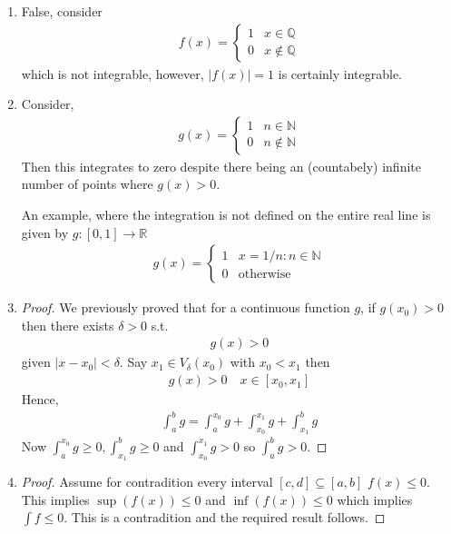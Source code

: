 \begin{enumerate}[label=(\alph*)]
    \item 
    False, consider
    \begin{align*}
        f(x) = \begin{cases}
            1 & x\in \mathbb{Q} \\
            0 & x\not\in \mathbb{Q} 
        \end{cases}
    \end{align*}
    which is not integrable, however, $|f(x)|=1$ is 
    certainly integrable.

    \item
    Consider,
    \begin{align*}
        g(x) = \begin{cases}
            1 & n\in \mathbb{N} \\
            0 & n\not\in \mathbb{N}
        \end{cases}
    \end{align*}
    Then this integrates to zero despite there being an (countabely) infinite 
    number of points where $g(x)>0$.

    An example, where the integration is not defined on the entire real 
    line is given by $g: [0,1]\rightarrow \mathbb{R}$
    \begin{align*}
        g(x) = \begin{cases}
            1 & x = 1/n : n\in \mathbb{N} \\
            0 & \text{otherwise}
        \end{cases}
    \end{align*}

    \item
    \begin{proof}
        We previously proved that for a continuous function $g$, if 
        $g(x_0)>0$ then there exists $\delta>0$ s.t. 
        \begin{align*}
            g(x)>0
        \end{align*}
        given $|x-x_0|<\delta$. Say $x_1 \in V_\delta(x_0)$ with 
        $x_0 < x_1$ then 
        \begin{align*}
            g(x)>0 \quad x\in [x_0,x_1]
        \end{align*}
        Hence, 
        \begin{align*}
            \int_a^b g = \int_a^{x_0} g + \int_{x_0}^{x_1} g + \int_{x_1}^{b} g 
        \end{align*}
        Now $ \int_a^{x_0} g\geq 0, \int_{x_1}^{b} g\geq 0$ and $\int_{x_0}^{x_1} g>0$
        so $\int_a^b g>0$.
    \end{proof}

    \item
    \begin{proof}
        Assume for contradition every interval $[c,d]\subseteq [a,b]$
        $f(x) \leq 0$. This implies $\sup(f(x))\leq 0$ and 
        $\inf(f(x))\leq 0$ which implies $\int f \leq 0$. This is a 
        contradition and the required result follows.
    \end{proof}
\end{enumerate}

